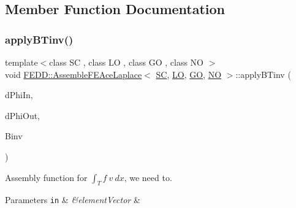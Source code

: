 \subsection{Member Function Documentation}
\mbox{\label{classFEDD_1_1AssembleFEAceLaplace_ab6836244e87f6f0ee28b6f611ec27717}} 
\subsubsection{\texorpdfstring{apply\+B\+Tinv()}{applyBTinv()}}
{\footnotesize\ttfamily template$<$class SC , class LO , class GO , class NO $>$ \\
void \hyperlink{classFEDD_1_1AssembleFEAceLaplace}{F\+E\+D\+D\+::\+Assemble\+F\+E\+Ace\+Laplace}$<$ \hyperlink{fe__test__laplace_8cpp_a79c7e86a57edbb2a5a53242bcd04e41e}{SC}, \hyperlink{fe__test__laplace_8cpp_ad6a38c9f07d3fd633eefca5bccad8410}{LO}, \hyperlink{fe__test__laplace_8cpp_afa2946b509009b4f45eb04bd8c5b27d9}{GO}, \hyperlink{fe__test__laplace_8cpp_a5e24f37b28787429872b6ecb1d0417ce}{NO} $>$\+::apply\+B\+Tinv (\begin{DoxyParamCaption}\item[{vec3\+D\+\_\+dbl\+\_\+ptr\+\_\+\+Type \&}]{d\+Phi\+In,  }\item[{vec3\+D\+\_\+dbl\+\_\+\+Type \&}]{d\+Phi\+Out,  }\item[{Small\+Matrix$<$ \hyperlink{fe__test__laplace_8cpp_a79c7e86a57edbb2a5a53242bcd04e41e}{SC} $>$ \&}]{Binv }\end{DoxyParamCaption})\hspace{0.3cm}{\ttfamily [private]}}



Assembly function for $ \int_T f ~ v ~dx $, we need to. 


\begin{DoxyParams}[1]{Parameters}
\mbox{\tt in}  & {\em \&element\+Vector} & \\
\hline
\end{DoxyParams}
\mbox{\label{classFEDD_1_1AssembleFEAceLaplace_ac47ac062ba522289f4e9a5dd2df78503}} 
